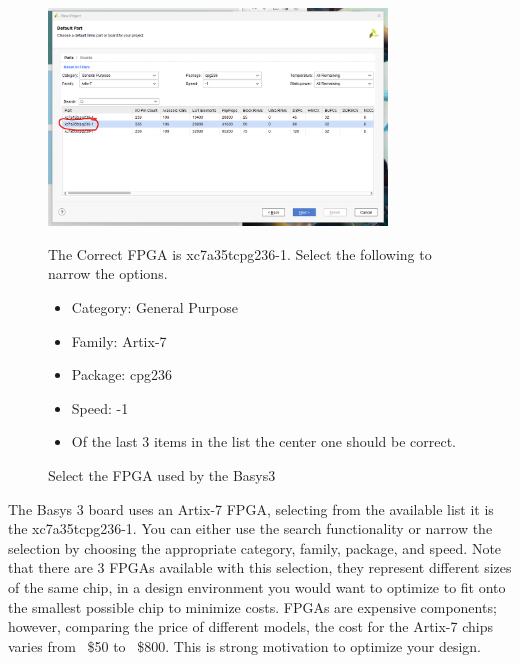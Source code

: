     \begin{figure}[H]
        \centering
        \includegraphics[width=9cm]{Images/CreateProjectImages/Vivado_CreateProject_Page4.png}
        \caption{Select the FPGA used by the Basys3}
        \label{fig:enter-label}
        \raggedright
        \vspace{0.5cm}
        The Correct FPGA is xc7a35tcpg236-1. Select the following to narrow the options.
        \begin{itemize}
            \item Category: General Purpose
            \item Family: Artix-7
            \item Package: cpg236
            \item Speed: -1
            \item Of the last 3 items in the list the center one should be correct.
        \end{itemize}
    \end{figure}
    The Basys 3 board uses an Artix-7 FPGA, selecting from the available list it is the xc7a35tcpg236-1. You can either use the search functionality or narrow the selection by choosing the appropriate category, family, package, and speed. Note that there are 3 FPGAs available with this selection, they represent different sizes of the same chip, in a design environment you would want to optimize to fit onto the smallest possible chip to minimize costs. FPGAs are expensive components; however, comparing the price of different models, the cost for the Artix-7 chips varies from ~\$50 to ~\$800. This is strong motivation to optimize your design. 

